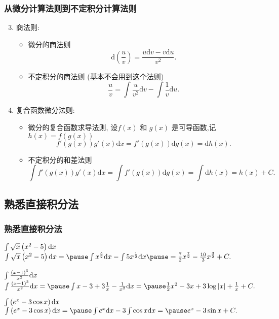\documentclass[
10pt,
aspectratio=43,
]{beamer}
\begin{document}
\begin{frame}
	\frametitle{从微分计算法则到不定积分计算法则}
	\begin{block}{}
		\begin{enumerate}\setcounter{enumi}{2}
			\pause \item 商法则:
			      \begin{itemize}
				      \pause \item 微分的商法则
				            $$
					            \mathrm{d}\left(\frac{u}{v}\right)=\frac{u\mathrm{d}v-v\mathrm{d}u}{v^2}.
				            $$
				            \pause \item 不定积分的商法则 \pause (基本不会用到这个法则)
				            $$
					            \frac{u}{v}=\int \frac{u}{v^2}\mathrm{d}v-\int\frac{1}{v}\mathrm{d}u.
				            $$

			      \end{itemize}
			      \pause \item 复合函数微分法则:
			      \begin{itemize}
				      \pause\item 微分的复合函数求导法则, 设$f(x)$ 和 $g(x)$ 是可导函数,记 $h(x) = f(g(x))$
				            $$
					            f'(g(x))g'(x)\mathrm{d}x=f'(g(x))\mathrm{d}g(x)=\mathrm{d}h(x).
				            $$
				      \item \pause 不定积分的和差法则
				            $$
					            \int f'(g(x))g'(x)\mathrm{d}x=\int f'(g(x))\mathrm{d}g(x)=\int \mathrm{d}h(x)= h(x)+C.
				            $$
			      \end{itemize}
		\end{enumerate}
	\end{block}
\end{frame}

\subsection{熟悉直接积分法}
\begin{frame}
	\frametitle{熟悉直接积分法}
	\everymath{\displaystyle}
	{\small
		\begin{exampleblock}{$\color{black}\int \sqrt{x}\left(x^2-5\right) \mathrm{d} x$}
			$
				\int \sqrt{x}\left(x^2-5\right) \mathrm{d}x= \pause \int x^{\frac{5}{2}}\mathrm{d}x-\int 5x^{\frac{1}{2}} \mathrm{d}x \pause =\frac{7}{2}x^{\frac{7}{2}}-\frac{10}{3}x^{\frac{3}{2}}+C.
			$
		\end{exampleblock}
		\pause
		\begin{exampleblock}{$\color{black}\int \frac{(x-1)^3}{x^2} \mathrm{d} x$}
			$
				\int \frac{(x-1)^3}{x^2} \mathrm{d} x= \pause \int x-3+3\frac{1}{x}-\frac{1}{x^2} \mathrm{d}x= \pause \frac{1}{2}x^2-3x+3\log|x|+\frac{1}{x}+C.
			$
		\end{exampleblock}
		\pause
		\begin{exampleblock}{$\color{black}\int\left(e^x-3 \cos x\right) \mathrm{d} x$}
			$
				\int\left(e^x-3 \cos x\right) \mathrm{d} x=\pause\int e^x\mathrm{d} x-3 \int\cos x \mathrm{d} x=\pause e^x-3\sin x+C.
			$
		\end{exampleblock}
	}
\end{frame}
\end{document}
